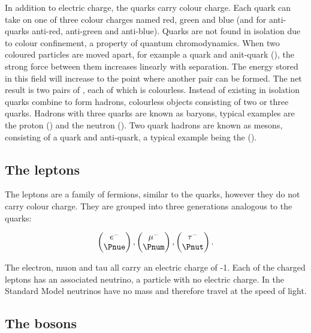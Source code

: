 In addition to electric charge, the quarks carry colour charge. Each quark can take on one of three colour charges named red, green and blue (and for anti-quarks anti-red, anti-green and anti-blue). Quarks are not found in isolation due to colour confinement, a property of quantum chromodynamics. When two coloured particles are moved apart, for example a quark and anit-quark (\Pq \Paq), the strong force between them increases linearly with separation. The energy stored in this field will increase to the point where another \Pq \Paq pair can be formed. The net result is two pairs of \Pq \Paq, each of which is colourless. Instead of existing in isolation quarks combine to form hadrons, colourless objects consisting of two or three quarks. Hadrons with three quarks are known as baryons, typical examples are the proton (\Pup\Pup\Pdown) and the neutron (\Pup\Pdown\Pdown). Two quark hadrons are known as mesons, consisting of a quark and anti-quark, a typical example being the  \Ppiplus (\Pup\APdown).

\subsection{The leptons}
\label{section:particle-physics:SM:leptons}

The leptons are a family of fermions, similar to the quarks, however they do not carry colour charge. They are grouped into three generations analogous to the quarks:


\begin{equation}
  \begin{pmatrix}
    e^{-} \\
    \Pnue
  \end{pmatrix}
  ,
  \begin{pmatrix}
    \mu^{-} \\
    \Pnum
  \end{pmatrix}
  ,
  \begin{pmatrix}
    \tau^{-} \\
    \Pnut
  \end{pmatrix}
.
\end{equation}

\noindent
The electron, muon and tau all carry an electric charge of -1. Each of the charged leptons has an associated neutrino, a particle with no electric charge. In the Standard Model neutrinos have no mass and therefore travel at the speed of light.


\subsection{The bosons}
\label{section:particle-physics:SM:bosons}

